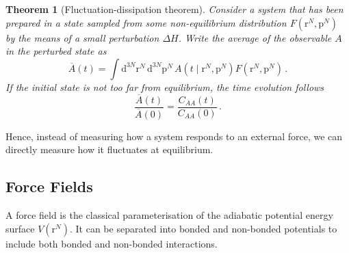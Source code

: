 \documentclass{article}
\theoremstyle{plain}\theoremheaderfont{\normalfont\itshape}\theorembodyfont{\rmfamily}\theoremseparator{.}\newtheorem*{rem}{Remark}\newtheorem*{ex}{Example}\newtheorem*{proof}{Proof}\newtheorem*{altp}{Alternative proof}
\theoremstyle{plain}\theoremheaderfont{\normalfont\bfseries}\theorembodyfont{\rmfamily}\theoremseparator{.}\newtheorem{thm}{Theorem}[section]\newtheorem{lem}[thm]{Lemma}\newtheorem{prop}[thm]{Proposition}\newtheorem*{cor}{Corollary}\newtheorem{defn}[thm]{Definition}\newtheorem{clm}[thm]{Claim}\newtheorem{clminproof}{Claim}\newtheorem{alg}[thm]{Algorithm}\newtheorem{hyp}[thm]{Hypothesis}\newtheorem{law}[thm]{Law}
\theoremstyle{break}\theoremheaderfont{\normalfont\itshape}\theorembodyfont{\rmfamily}\theoremseparator{.\medskip}\newtheorem*{proofskip}{Proof}\newtheorem*{exs}{Examples}\newtheorem*{rems}{Remarks}
\theoremstyle{break}\theoremheaderfont{\normalfont\bfseries}\theorembodyfont{\rmfamily}\theoremseparator{.\medskip}\newtheorem{lemskip}[thm]{Lemma}\newtheorem{defnskip}[thm]{Definition}\newtheorem{propskip}[thm]{Proposition}\newtheorem{thmskip}[thm]{Theorem}
\numberwithin{equation}{section}
\newcommand{\dd}[2][]{\mathrm{d}^{#1} #2\,}
\newcommand{\vb}[1]{\bm{\mathrm{#1}}}
\begin{document}
    \begin{thm}[Fluctuation-dissipation theorem]
        Consider a system that has been prepared in a state sampled from some non-equilibrium distribution \(F(\vb{r}^N,\vb{p}^N)\) by the means of a small perturbation \(\Delta H\). Write the average of the observable \(A\) in the perturbed state as
        \begin{equation}
            \overline{A}(t)=\int\dd[3N]{\vb{r}^N}\dd[3N]{\vb{p}^N}A(t\mid\vb{r}^N,\vb{p}^N)F(\vb{r}^N,\vb{p}^N)\,.
        \end{equation}
        If the initial state is not too far from equilibrium, the time evolution follows
        \begin{equation}
            \frac{\overline{A}(t)}{\overline{A}(0)}=\frac{C_{AA}(t)}{C_{AA}(0)}\,.
        \end{equation}
    \end{thm}

    Hence, instead of measuring how a system responds to an external force, we can directly measure how it fluctuates at equilibrium.

    \subsection{Force Fields}
    A force field is the classical parameterisation of the adiabatic potential energy surface \(V(\vb{r}^N)\). It can be separated into bonded and non-bonded potentials to include both bonded and non-bonded interactions.
\end{document}
